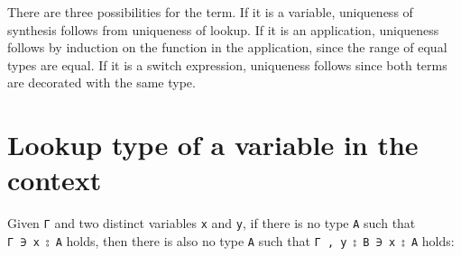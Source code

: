 There are three possibilities for the term. If it is a variable,
uniqueness of synthesis follows from uniqueness of lookup. If it is an
application, uniqueness follows by induction on the function in the
application, since the range of equal types are equal. If it is a switch
expression, uniqueness follows since both terms are decorated with the
same type.

\hypertarget{lookup-type-of-a-variable-in-the-context}{%
\section{Lookup type of a variable in the
context}\label{lookup-type-of-a-variable-in-the-context}}

Given \texttt{Γ} and two distinct variables \texttt{x} and \texttt{y},
if there is no type \texttt{A} such that \texttt{Γ\ ∋\ x\ ⦂\ A} holds,
then there is also no type \texttt{A} such that
\texttt{Γ\ ,\ y\ ⦂\ B\ ∋\ x\ ⦂\ A} holds:

